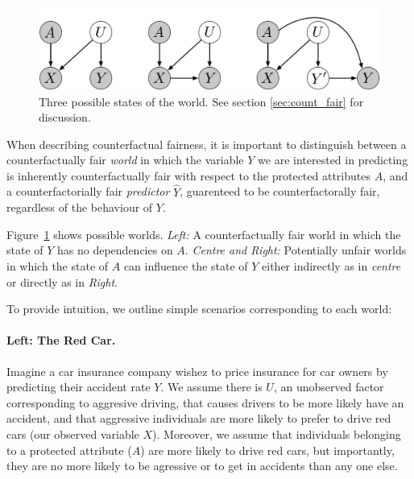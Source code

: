 \begin{figure}[th!]
\begin{center}
\vspace{-2ex}
\centerline{\includegraphics[width=\textwidth]{simple_models_no_q}}
\vspace{-2ex}
\caption{Three possible states of the world.\label{figure.simple_models} See section \ref{sec:count_fair} for discussion.}
\vspace{-2ex}
\end{center}
\end{figure}

When describing counterfactual fairness, it is important to
distinguish between a counterfactually fair {\em world} in which the
variable $Y$ we are interested in predicting is inherently
counterfactually fair with respect to the protected attributes $A$,
and a counterfactorially fair {\em predictor} $\hat Y$, guarenteed to
be counterfactorally fair, regardless of the behaviour of $Y$.

Figure~\ref{figure.simple_models} shows possible worlds. {\em Left:} A
counterfactually fair world in which the state of $Y$ has no
dependencies on $A$. {\em Centre and Right:} Potentially unfair worlds
in which the state of $A$ can influence the state of $Y$ either
indirectly as in {\em centre} or directly as in {\em Right}.

To provide intuition, we outline simple scenarios corresponding to each world:
\paragraph{Left: The Red Car.}
Imagine a car insurance company wishez to price insurance for car owners by
predicting their accident rate $Y$. We assume there is $U$, an
unobserved factor corresponding to aggresive driving, that causes
drivers to be more likely have an accident, and that aggressive
individuals are more likely to prefer to drive red cars (our observed
variable $X$). Moreover, we assume that individuals belonging to a
protected attribute ($A$) are more likely to drive red cars, but
importantly, they are no more likely to be agressive or to get in
accidents than any one else.


